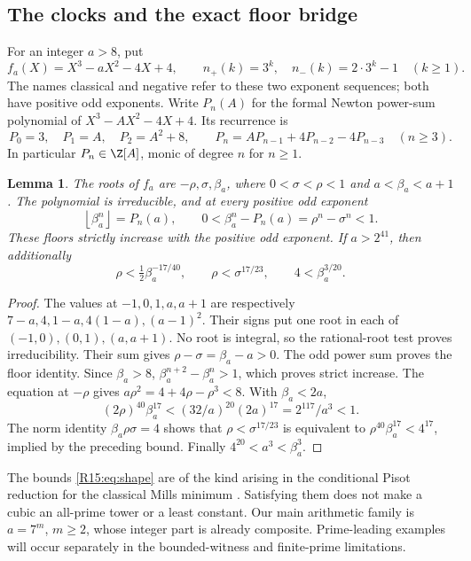\documentclass[11pt,a4paper]{article}
\newtheorem{lemma}[theorem]{Lemma}\newtheorem{proposition}[theorem]{Proposition}
\theoremstyle{definition}\newtheorem{definition}[theorem]{Definition}
\theoremstyle{remark}\newtheorem{remark}[theorem]{Remark}
\newcommand{\floor}[1]{\left\lfloor#1\right\rfloor}
\begin{document}
\subsection{The clocks and the exact floor bridge}

For an integer $a>8$, put
\[
 f_a(X)=X^3-aX^2-4X+4,
 \qquad n_+(k)=3^k,\quad n_-(k)=2\cdot3^k-1\quad(k\ge1).
\]
The names classical and negative refer to these two exponent sequences;
both have positive odd exponents. Write $P_n(A)$ for the formal Newton
power-sum polynomial of $X^3-AX^2-4X+4$. Its recurrence is
\begin{equation}\label{R15:eq:rec}
 P_0=3,\quad P_1=A,\quad P_2=A^2+8,\qquad
 P_n=AP_{n-1}+4P_{n-2}-4P_{n-3}\quad(n\ge3).
\end{equation}
In particular $P_n\in\Z[A]$, monic of degree $n$ for $n\ge1$.

\begin{lemma}\label{R15:lem:floor}
The roots of $f_a$ are $-\rho,\sigma,\beta_a$, where
$0<\sigma<\rho<1$ and $a<\beta_a<a+1$. The polynomial is
irreducible, and at every positive odd exponent
\[
 \floor{\beta_a^n}=P_n(a),\qquad
 0<\beta_a^n-P_n(a)=\rho^n-\sigma^n<1.
\]
These floors strictly increase with the positive odd exponent. If
$a>2^{41}$, then additionally
\begin{equation}\label{R15:eq:shape}
 \rho<\tfrac12\beta_a^{-17/40},\qquad
 \rho<\sigma^{17/23},\qquad 4<\beta_a^{3/20}.
\end{equation}
\end{lemma}
\begin{proof}
The values at $-1,0,1,a,a+1$ are respectively
$7-a,4,1-a,4(1-a),(a-1)^2$. Their signs put one root in each
of $(-1,0),(0,1),(a,a+1)$. No root is integral, so the rational-root
test proves irreducibility. Their sum gives $\rho-\sigma=\beta_a-a>0$.
The odd power sum proves the floor identity. Since $\beta_a>8$,
$\beta_a^{n+2}-\beta_a^n>1$, which proves strict increase.
The equation at $-\rho$ gives $a\rho^2=4+4\rho-\rho^3<8$.
With $\beta_a<2a$,
\[
 (2\rho)^{40}\beta_a^{17}
 <(32/a)^{20}(2a)^{17}=2^{117}/a^3<1.
\]
The norm identity $\beta_a\rho\sigma=4$ shows that
$\rho<\sigma^{17/23}$ is equivalent to
$\rho^{40}\beta_a^{17}<4^{17}$, implied by the preceding bound.
Finally $4^{20}<a^3<\beta_a^3$.
\end{proof}

The bounds \eqref{R15:eq:shape} are of the kind arising in the conditional
Pisot reduction for the classical Mills minimum
\cite[Theorem 1.7]{Saito}. Satisfying them does not make a cubic an
all-prime tower or a least constant. Our main arithmetic family is
$a=7^m$, $m\ge2$, whose integer part is already composite.
Prime-leading examples will occur separately in the bounded-witness
and finite-prime limitations.
\end{document}
